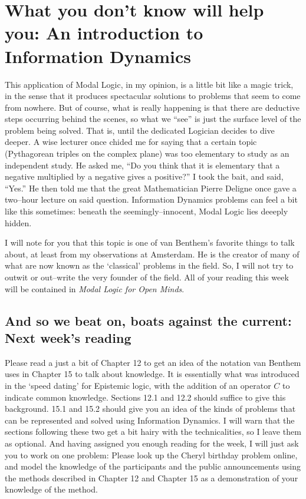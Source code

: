 \chapter[Week of Information Dynamics]{What you don't know will help you: An introduction to Information Dynamics}

This application of Modal Logic, in my opinion, is a little bit like a magic trick, in the sense that it produces spectacular solutions
to problems that seem to come from nowhere. But of course, what is really happening is that there are deductive steps occurring behind
the scenes, so what we ``see'' is just the surface level of the problem being solved. That is, until the dedicated Logician decides
to dive deeper. A wise lecturer once chided me for saying that a certain topic (Pythagorean triples on the complex plane) was too
elementary to study as an  independent study. He asked me, ``Do you think that it is elementary that a negative multiplied by a
negative gives a positive?'' I took the bait, and said, ``Yes.'' He then told me that the great Mathematician Pierre Deligne once gave
a two--hour lecture on said question. Information Dynamics problems can feel a bit like this sometimes: beneath the seemingly--innocent,
Modal Logic lies deeeply hidden.

I will note for you that this topic is one of van Benthem's favorite things to talk about, at least from
my observations at Amsterdam. He is the creator of many of what are now known as the  `classical' problems in the field. So, I will not
try to outwit or out--write the very founder of the field. All of your reading this week will be contained in \emph{Modal Logic for
Open Minds}.

\setcounter{section}{-1}

\section{And so we beat on, boats against the current: Next week's reading}
Please read a just a bit of Chapter 12 to get an idea of the notation van Benthem uses in Chapter 15 to talk about knowledge. It is
essentially what was introduced in the `speed dating' for Epistemic logic, with the addition of an operator $C$ to indicate common
knowledge. Sections 12.1 and 12.2 should suffice to give this background. 15.1 and 15.2 should give you an idea of the kinds of problems
that can be represented and solved using Information Dynamics. I will warn that the sections following these two get a bit hairy with
the technicalities, so I leave them as optional. And having assigned you enough reading for the week, I will just ask you
to work on one problem: Please look up the Cheryl birthday problem online, and model the knowledge of the participants and the
public announcements using the methods described in Chapter 12 and Chapter 15 as a demonstration of your knowledge of the method.